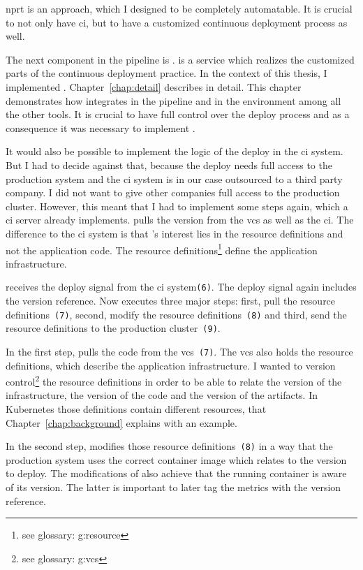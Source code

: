 \gls{nprt} is an approach, which I designed to be completely automatable. It is crucial to
not only have \gls{ci}, but to have a customized continuous deployment process as well.

The next component in the pipeline is \deployer{}. \deployer{} is a service which realizes
the customized parts of the continuous deployment practice. In the context of this thesis,
I implemented \deployer{}. Chapter~\ref{chap:detail} describes \deployer{} in detail. This
chapter demonstrates how \deployer{} integrates in the pipeline and in the environment among
all the other tools. It is crucial to have full control over the deploy process and as a
consequence it was necessary to implement \deployer{}.

It would also be possible to implement the logic of the deploy in the \gls{ci} system. But
I had to decide against that, because the deploy needs full access to the production
system and the \gls{ci} system is in our case outsourced to a third party company. I did
not want to give other companies full access to the production cluster. However, this
meant that I had to implement some steps again, which a \gls{ci} server already
implements. \deployer{} pulls the version from the \gls{vcs} as well as the \gls{ci}. The
difference to the \gls{ci} system is that \deployer{}'s interest lies in the resource
definitions and not the application code. The resource definitions\footnote{see glossary:
  \gls{g:resource}} define the application infrastructure.

\deployer{} receives the deploy signal from the \gls{ci} system\texttt{(6)}. The deploy
signal again includes the version reference. Now \deployer{} executes three major steps:
first, pull the resource definitions~\texttt{(7)}, second, modify the resource
definitions~\texttt{(8)} and third, send the resource definitions to the production
cluster~\texttt{(9)}.

In the first step, \deployer{} pulls the code from the \gls{vcs}~\texttt{(7)}. The \gls{vcs}
also holds the resource definitions, which describe the application infrastructure. I
wanted to version control\footnote{see glossary: \gls{g:vcs}} the resource definitions in
order to be able to relate the version of the infrastructure, the version of the code and
the version of the artifacts. In Kubernetes those definitions contain different resources,
that Chapter~\ref{chap:background} explains with an example.

In the second step, \deployer{} modifies those resource definitions~\texttt{(8)} in a way
that the production system uses the correct container image which relates to the version
to deploy. The modifications of \deployer{} also achieve that the running container is aware
of its version. The latter is important to later tag the metrics with the version
reference.

